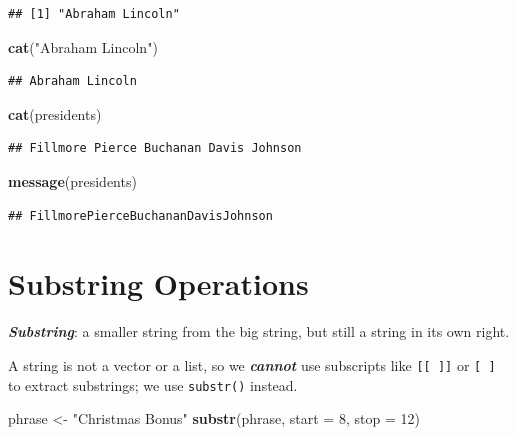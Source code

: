 \documentclass[
]{book}
\newenvironment{Shaded}{\begin{snugshade}}{\end{snugshade}}
\newcommand{\DataTypeTok}[1]{\textcolor[rgb]{0.13,0.29,0.53}{#1}}
\newcommand{\DecValTok}[1]{\textcolor[rgb]{0.00,0.00,0.81}{#1}}
\newcommand{\KeywordTok}[1]{\textcolor[rgb]{0.13,0.29,0.53}{\textbf{#1}}}
\newcommand{\NormalTok}[1]{#1}
\newcommand{\StringTok}[1]{\textcolor[rgb]{0.31,0.60,0.02}{#1}}
\begin{document}
\begin{verbatim}
## [1] "Abraham Lincoln"
\end{verbatim}

\begin{Shaded}
\begin{Highlighting}[]
\KeywordTok{cat}\NormalTok{(}\StringTok{"Abraham Lincoln"}\NormalTok{)}
\end{Highlighting}
\end{Shaded}

\begin{verbatim}
## Abraham Lincoln
\end{verbatim}

\begin{Shaded}
\begin{Highlighting}[]
\KeywordTok{cat}\NormalTok{(presidents)}
\end{Highlighting}
\end{Shaded}

\begin{verbatim}
## Fillmore Pierce Buchanan Davis Johnson
\end{verbatim}

\begin{Shaded}
\begin{Highlighting}[]
\KeywordTok{message}\NormalTok{(presidents)}
\end{Highlighting}
\end{Shaded}

\begin{verbatim}
## FillmorePierceBuchananDavisJohnson
\end{verbatim}

\hypertarget{substring-operations}{%
\section{Substring Operations}\label{substring-operations}}

\textbf{\emph{Substring}}: a smaller string from the big string, but still a string in its own right.

A string is not a vector or a list, so we \textbf{\emph{cannot}} use subscripts like \texttt{{[}{[}\ {]}{]}} or \texttt{{[}\ {]}} to extract substrings; we use \texttt{substr()} instead.

\begin{Shaded}
\begin{Highlighting}[]
\NormalTok{phrase <-}\StringTok{ "Christmas Bonus"}
\KeywordTok{substr}\NormalTok{(phrase, }\DataTypeTok{start =} \DecValTok{8}\NormalTok{,}
    \DataTypeTok{stop =} \DecValTok{12}\NormalTok{)}
\end{Highlighting}
\end{Shaded}
\end{document}
